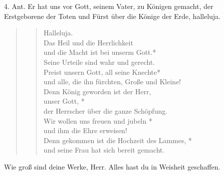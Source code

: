 \newpage

\def\greinitialformat#1{{\fontsize{40}{40}\selectfont #1}}
\gresetfirstlineaboveinitial{\small \textcolor{red}{Offb 19,1-7}}{}
\setaboveinitialseparation{0.72mm}


\medskip

\begin{sloppypar}
{\noindent\rm{4. Ant. Er hat uns vor Gott, seinem Vater, zu Königen gemacht\-, 
der Erstgeborene der Toten und Fürst über die Könige der Erde, halleluja.}}
\end{sloppypar}

\bigskip


\begin{quote}
\begin{verse}

Halleluja.\\ 
Das Heil und die Herrlichkeit\\
und die Macht ist bei unserm Gott.*\\
Seine Urteile sind wahr und gerecht.\\
\vin Preist unsern Gott, all seine Knechte*\\
\vin und alle, die ihn fürchten, Große und Kleine!\\
Denn König geworden ist der Herr,\\
unser Gott, *\\
der Herrscher über die ganze Schöpfung.\\
\vin Wir wollen uns freuen und jubeln *\\
\vin und ihm die Ehre erweisen!\\
Denn gekommen ist die Hochzeit des Lammes, *\\
und seine Frau hat sich bereit gemacht.

\end{verse}
\end{quote}

\medskip

\resp


\medskip

\begin{sloppypar}
{\noindent\rm{ Wie groß sind deine Werke, Herr. Alles hast du in Weisheit geschaffen.}}
\end{sloppypar}

